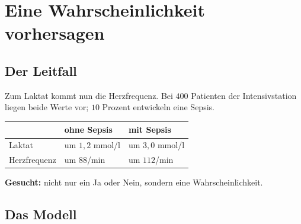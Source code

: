 \chapter{Eine Wahrscheinlichkeit vorhersagen}

\section{Der Leitfall}

\begin{merksatz}
Zum Laktat kommt nun die Herzfrequenz. Bei $400$ Patienten der Intensivstation liegen beide Werte vor; $10$ Prozent entwickeln eine Sepsis.

\begin{center}
{\small
\renewcommand{\arraystretch}{1.5}
\begin{tabular}{@{}P{2.4cm}P{2.8cm}P{2.8cm}@{}}
\toprule
& \textbf{ohne Sepsis} & \textbf{mit Sepsis}\\
\midrule
Laktat & um $1{,}2$ mmol/l & um $3{,}0$ mmol/l\\
Herzfrequenz & um $88$/min & um $112$/min\\
\bottomrule
\end{tabular}}
\end{center}

\textbf{Gesucht:} nicht nur ein Ja oder Nein, sondern eine Wahrscheinlichkeit.

\begin{center}
\begin{minipage}{0.88\textwidth}
\end{minipage}
\end{center}
\end{merksatz}

\section{Das Modell}

